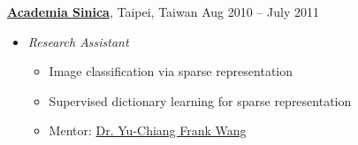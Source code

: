 \documentclass[10pt]{article}
\newenvironment{innerlist}[1][\enskip\textbullet]%
        {\begin{itemize}[#1,leftmargin=*,parsep=0pt,itemsep=0pt,topsep=0pt,partopsep=0pt]}
        {\end{itemize}}
\begin{document}
\vspace{.1in}
\href{http://www.sinica.edu.tw}{\textbf{Academia Sinica}}, Taipei, Taiwan \hfill {Aug 2010 -- July 2011} \\
\vspace{-.15in}
\begin{innerlist}
\item[] \emph{Research Assistant} \\
    \vspace{-.15in}
    \begin{innerlist}
    \item Image classification via sparse representation
    \item Supervised dictionary learning for sparse representation
    \item Mentor: \href{http://www.citi.sinica.edu.tw/pages/ycwang/}{Dr. Yu-Chiang Frank Wang}
    \end{innerlist}
\end{innerlist}
\end{document}
